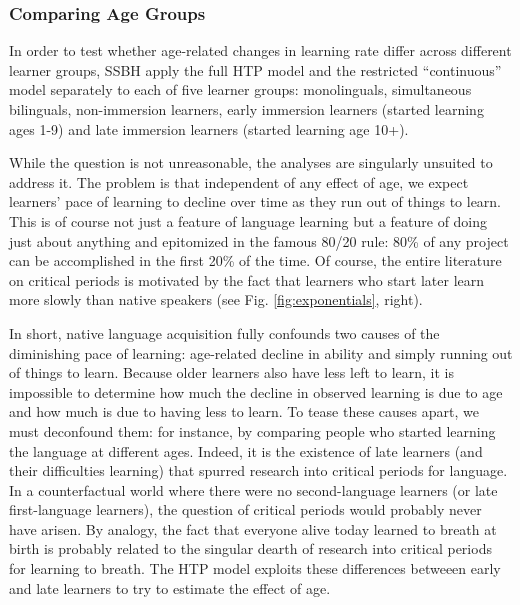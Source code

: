 \documentclass[
  english,
  doc,floatsintext]{apa6}
\begin{document}
\hypertarget{comparing-age-groups}{%
\subsubsection{Comparing Age Groups}\label{comparing-age-groups}}

In order to test whether age-related changes in learning rate differ across different learner groups, SSBH apply the full HTP model and the restricted ``continuous'' model separately to each of five learner groups: monolinguals, simultaneous bilinguals, non-immersion learners, early immersion learners (started learning ages 1-9) and late immersion learners (started learning age 10+).

While the question is not unreasonable, the analyses are singularly unsuited to address it. The problem is that independent of any effect of age, we expect learners' pace of learning to decline over time as they run out of things to learn. This is of course not just a feature of language learning but a feature of doing just about anything and epitomized in the famous 80/20 rule: 80\% of any project can be accomplished in the first 20\% of the time. Of course, the entire literature on critical periods is motivated by the fact that learners who start later learn more slowly than native speakers (see Fig. \ref{fig:exponentials}, right).

In short, native language acquisition fully confounds two causes of the diminishing pace of learning: age-related decline in ability and simply running out of things to learn. Because older learners also have less left to learn, it is impossible to determine how much the decline in observed learning is due to age and how much is due to having less to learn. To tease these causes apart, we must deconfound them: for instance, by comparing people who started learning the language at different ages. Indeed, it is the existence of late learners (and their difficulties learning) that spurred research into critical periods for language. In a counterfactual world where there were no second-language learners (or late first-language learners), the question of critical periods would probably never have arisen. By analogy, the fact that everyone alive today learned to breath at birth is probably related to the singular dearth of research into critical periods for learning to breath. The HTP model exploits these differences betweeen early and late learners to try to estimate the effect of age.
\end{document}
